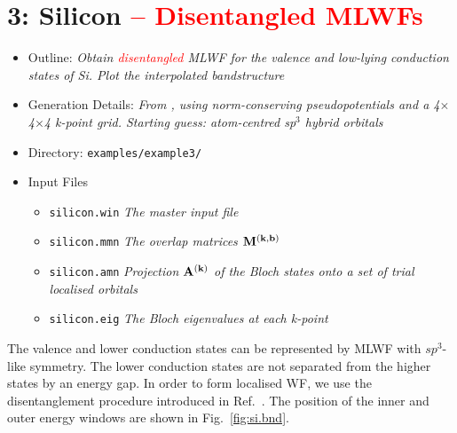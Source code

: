\documentclass[a4paper,11pt,twoside]{article}
\def\tent#1{\textcolor{red}{#1}}     %
\begin{document}
\cleardoublepage


\section*{3: Silicon \tent{-- Disentangled MLWFs}}

\begin{itemize}
\item{Outline: \it{Obtain \tent{disentangled} MLWF for the valence and low-lying
    conduction states of Si. Plot the interpolated bandstructure}} 
\item{Generation Details: \it{From \pwscf, using norm-conserving
    pseudopotentials and a 4$\times$4$\times$4 k-point grid. Starting
    guess: atom-centred sp$^3$ hybrid orbitals}} 
\item{Directory: {\tt examples/example3/}}
\item{Input Files}
\begin{itemize}
\item{ {\tt silicon.win}  {\it The master input file}}
\item{ {\tt silicon.mmn}  {\it The overlap matrices $\mathbf{M}^{(\mathbf{k},\mathbf{b})}$}}
\item{ {\tt silicon.amn}  {\it Projection $\mathbf{A}^{(\mathbf{k})}$ of the Bloch states onto a
    set of trial localised orbitals}} 
\item{ {\tt silicon.eig}  {\it The Bloch eigenvalues at each k-point}}
\end{itemize}
\end{itemize}
The valence and lower conduction states can be represented by MLWF
with $sp^3$-like symmetry. The lower conduction states are not 
separated from the higher states by an energy gap. In order to form
localised WF, we use the disentanglement procedure
introduced in Ref.~\cite{SMV}. The position of the inner and outer
energy windows are shown in Fig.~\ref{fig:si.bnd}. 
\end{document}
